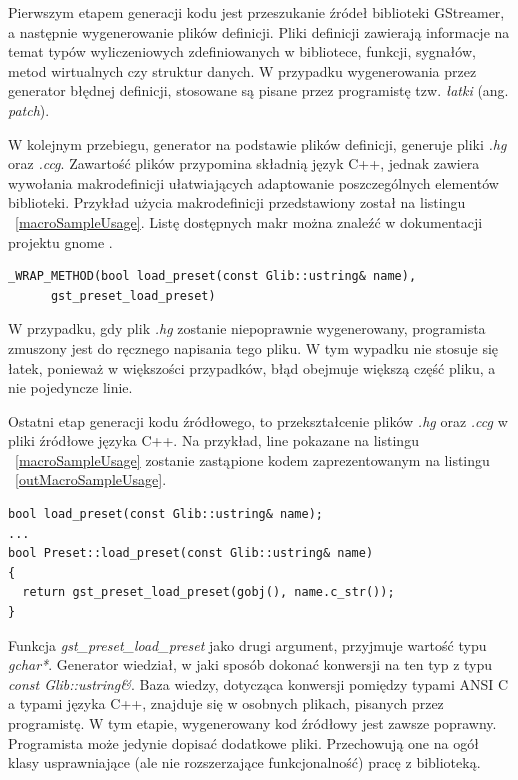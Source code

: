 \documentclass[12pt]{article}
\begin{document}
Pierwszym etapem generacji kodu jest przeszukanie źródeł biblioteki GStreamer, a następnie wygenerowanie plików definicji. Pliki definicji zawierają informacje na temat typów wyliczeniowych zdefiniowanych w bibliotece, funkcji, sygnałów, metod wirtualnych czy struktur danych. W przypadku wygenerowania przez generator błędnej definicji, stosowane są pisane przez programistę tzw. \textit{łatki} (ang. \textit{patch}).

W kolejnym przebiegu, generator na podstawie plików definicji, generuje pliki \textit{.hg} oraz \textit{.ccg}. Zawartość plików przypomina składnią język C++, jednak zawiera wywołania makrodefinicji ułatwiających adaptowanie poszczególnych elementów biblioteki. Przykład użycia makrodefinicji przedstawiony został na listingu ~\ref{macroSampleUsage}.
Listę dostępnych makr można znaleźć w dokumentacji projektu gnome \cite{devgnomepage}.
    \begin{lstlisting}[caption=Przykład użycia makrodefinicji w pliku \textit{.hg}, label=macroSampleUsage]
_WRAP_METHOD(bool load_preset(const Glib::ustring& name), 
      gst_preset_load_preset)
    \end{lstlisting}
    W przypadku, gdy plik \textit{.hg} zostanie niepoprawnie wygenerowany, programista zmuszony jest do ręcznego napisania tego pliku. W tym wypadku nie stosuje się łatek, ponieważ w większości przypadków, błąd obejmuje większą część pliku, a nie pojedyncze linie.

Ostatni etap generacji kodu źródłowego, to przekształcenie plików \textit{.hg} oraz \textit{.ccg} w pliki źródłowe języka C++. Na przykład, line pokazane na listingu ~\ref{macroSampleUsage} zostanie zastąpione kodem zaprezentowanym na listingu ~\ref{outMacroSampleUsage}.
    \begin{lstlisting}[caption=Kod źródłowy wygenerowany na podstawie makrodefinicji, label=outMacroSampleUsage]
bool load_preset(const Glib::ustring& name);
...
bool Preset::load_preset(const Glib::ustring& name)
{
  return gst_preset_load_preset(gobj(), name.c_str());
}
    \end{lstlisting}
    Funkcja \textit{gst\_preset\_load\_preset} jako drugi argument, przyjmuje wartość typu \textit{gchar*}. Generator wiedział, w jaki sposób dokonać konwersji na ten typ z typu \textit{const Glib::ustring\&}. Baza wiedzy, dotycząca konwersji pomiędzy typami ANSI C a typami języka C++, znajduje się w osobnych plikach, pisanych przez programistę.
W tym etapie, wygenerowany kod źródłowy jest zawsze poprawny. Programista może jedynie dopisać dodatkowe pliki. Przechowują one na ogół klasy usprawniające (ale nie rozszerzające funkcjonalność) pracę z biblioteką.
\cleardoublepage
\end{document}
